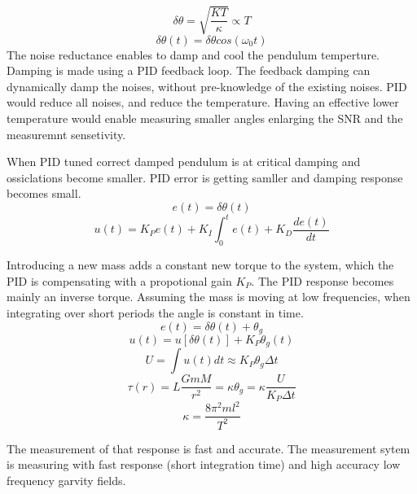 \documentclass[\main/master.tex]{subfiles}
\begin{document}
\begin{equation}
\delta\theta = \sqrt{\frac{KT}{\kappa}}\propto{T}  \label{eqn:radiation force}
\end{equation}
\begin{equation}
\delta\theta(t) = \delta\theta cos(\omega_0 t)   \label{eqn:pid_error}
\end{equation}
The noise reductance enables to damp and cool the pendulum temperture. Damping is made using a PID feedback loop. The feedback damping can dynamically damp the noises, without pre-knowledge of the existing noises. PID would reduce all noises, and reduce the temperature. Having an effective lower temperature would enable measuring smaller angles enlarging the SNR and the measuremnt sensetivity.
\par
When PID tuned correct damped pendulum is at critical damping and ossiclations become smaller. PID error is getting samller and damping response becomes small. 
\begin{equation}
e(t) = \delta\theta(t)   \label{eqn:pid_error}
\end{equation}
\begin{equation}
u(t) = K_Pe(t)+K_I\int_{0}^{t}e(t)+K_D\frac{de(t)}{dt}   \label{eqn:PID_eq}
\end{equation}

Introducing a new mass adds a constant new torque to the system, which the PID is compensating with a propotional gain $K_P$. The PID response becomes mainly an inverse torque. Assuming the mass is moving at low frequencies, when integrating over short periods the angle is constant in time.
\begin{equation}
e(t) = \delta\theta(t) + \theta_g    \label{eqn:PID_measurement}
\end{equation}
\begin{equation}
u(t) = u[ \delta\theta(t)] + K_P\theta_g(t) \label{eqn:PID_measurement_eq}
\end{equation}
\begin{equation}
U = \int u(t)dt  \approx K_P\theta_g\Delta t \label{eqn:PID_measurement_eq}
\end{equation}
\begin{equation}
\tau(r) = L\frac{GmM}{r^2} =  \kappa\theta_g = \kappa\frac{U}{K_P\Delta t}      \label{eqn:pid_gravitation_torque}
\end{equation}
\begin{equation}
\kappa =\frac{8\pi^2ml^2}{T^2}    \label{eqn:empirical_torque}
\end{equation}

The measurement of that response is fast and accurate. The measurement sytem is measuring with fast response (short integration time) and high accuracy low frequency garvity fields. 

 
 
 
 
\end{document}
